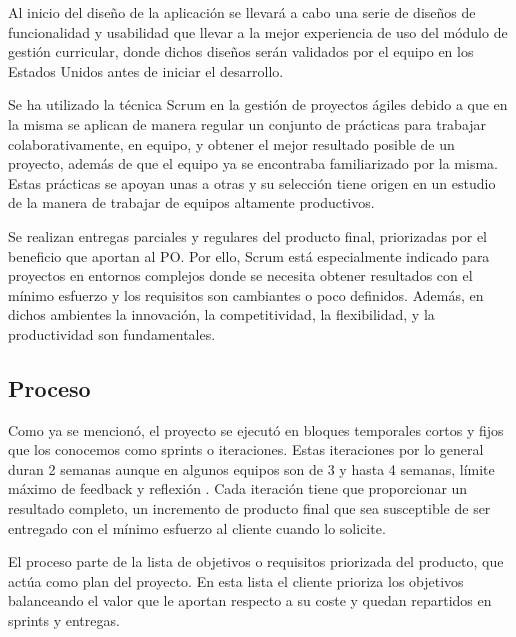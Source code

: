Al inicio del diseño de la aplicación se llevará a cabo una serie de diseños de funcionalidad y usabilidad que llevar a la mejor experiencia de uso del módulo de gestión curricular, donde dichos diseños serán validados por el equipo en los Estados Unidos antes de iniciar el desarrollo.

Se ha utilizado la técnica Scrum en la gestión de proyectos ágiles debido a que en la misma se aplican de manera regular un conjunto de prácticas para trabajar colaborativamente, en equipo, y obtener el mejor resultado posible de un proyecto, además de que el equipo ya se encontraba familiarizado por la misma. Estas prácticas se apoyan unas a otras y su selección tiene origen en un estudio de la manera de trabajar de equipos altamente productivos.

Se realizan entregas parciales y regulares del producto final, priorizadas por el beneficio que aportan al PO. Por ello, Scrum está especialmente indicado para proyectos en entornos complejos donde se necesita obtener resultados con el mínimo esfuerzo y los requisitos son cambiantes o poco definidos. Además, en dichos ambientes la innovación, la competitividad, la flexibilidad, y la productividad son fundamentales.

\subsection{Proceso}
Como ya se mencionó, el proyecto se ejecutó en bloques temporales cortos y fijos que los conocemos como sprints o iteraciones. Estas iteraciones por lo general duran 2 semanas aunque en algunos equipos son de 3 y hasta 4 semanas, límite máximo de feedback y reflexión \citep{davis_agile_2015}. Cada iteración tiene que proporcionar un resultado completo, un incremento de producto final que sea susceptible de ser entregado con el mínimo esfuerzo al cliente cuando lo solicite.

El proceso parte de la lista de objetivos o requisitos priorizada del producto, que actúa como plan del proyecto. En esta lista el cliente prioriza los objetivos balanceando el valor que le aportan respecto a su coste y quedan repartidos en sprints y entregas.


